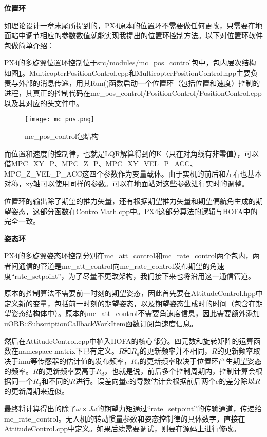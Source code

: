 \textbf{位置环}

如理论设计一章末尾所提到的，PX4原本的位置环不需要做任何更改，只需要在地面站中调节相应的参数数值就能实现我提出的位置环控制方法。以下对位置环软件包做简单介绍：

PX4的多旋翼位置环控制位于src/modules/mc\_pos\_control包中，包内层次结构如图\ref{mc_pos}。MulticopterPositionControl.cpp和MulticopterPositionControl.hpp主要负责与外部的消息传递，用其Run()函数启动一个位置环（包括位置和速度）控制的进程，其真正的控制代码在mc\_pos\_control/PositionControl/PositionControl.cpp以及其对应的头文件中。

\begin{figure}[!h]
  \centering
  \texttt{[image: mc\_pos.png]}
  \caption{mc\_pos\_control包结构}
  \label{mc_pos}
\end{figure}

而位置和速度的控制律，也就是LQR解算得到的K（只在对角线有非零值），可以借MPC\_XY\_P、MPC\_Z\_P、MPC\_XY\_VEL\_P\_ACC、MPC\_Z\_VEL\_P\_ACC这四个参数作为变量载体。由于实机的前后和左右也基本对称，xy轴可以使用同样的参数。可以在地面站对这些参数进行实时的调整。

位置环的输出除了期望的推力矢量，还有根据期望推力矢量和期望偏航角生成的期望姿态，这部分函数在ControlMath.cpp中。PX4这部分算法的逻辑与HOFA中的完全一致。

\textbf{姿态环}

PX4的多旋翼姿态环控制分别在mc\_att\_control和mc\_rate\_control两个包内，两者间通信的管道是mc\_att\_control向mc\_rate\_control发布期望的角速度“rate\_setpoint”，为了尽量不更改架构，我们接下来也将沿用这一通信管道。

原本的控制算法不需要前一时刻的期望姿态，因此首先要在AttitudeControl.hpp中定义新的变量，包括前一时刻的期望姿态，以及期望姿态生成时的时间（包含在期望姿态结构体中）。原本的mc\_att\_control不需要角速度信息，因此需要额外添加uORB::SubscriptionCallbackWorkItem函数订阅角速度信息。

然后在AttitudeControl.cpp中植入HOFA的核心部分。四元数和旋转矩阵的运算函数在namespace matrix下已有定义。$R$和$R_d$的更新频率并不相同，$R$的更新频率取决于imu等传感器的估计值的发布频率，$R_d$的更新频率取决于位置环产生期望姿态的频率。$R$的更新频率要高于$R_d$，也就是说，前后多个控制周期内，控制计算会根据同一个$R_d$和不同的$R$进行。误差向量$e$的导数估计会根据前后两个$e$的差分除以$R$的更新周期来近似。

最终将计算得出的除了$\omega \times J\omega$的期望力矩通过“rate\_setpoint”的传输通道，传递给mc\_rate\_control。无人机的转动惯量参数和姿态控制律的具体数字，直接在AttitudeControl.cpp中定义。如果后续需要调试，则要在源码上进行修改。

